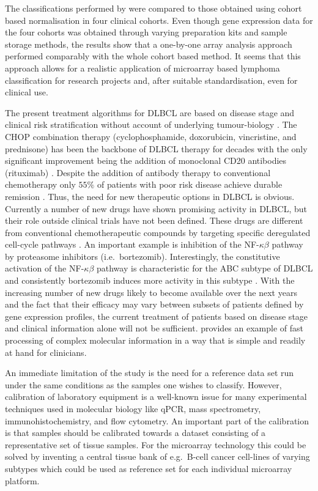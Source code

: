 \documentclass{article}
\begin{document}
The classifications performed by \hemaClass{} were compared to those obtained using cohort based normalisation in four clinical cohorts.
Even though gene expression data for the four cohorts was obtained through varying preparation kits and sample storage methods, the results show that a one-by-one array analysis approach performed comparably with the whole cohort based method.
It seems that this approach allows for a realistic application of microarray based lymphoma classification for research projects and, after suitable standardisation, even for clinical use.

The present treatment algorithms for DLBCL are based on disease stage and clinical risk stratification without account of underlying tumour-biology \citep{Schmoll2012}.
The CHOP combination therapy (cyclophosphamide, doxorubicin, vincristine, and prednisone) has been the backbone of DLBCL therapy for decades with the only significant improvement being the addition of monoclonal CD20 antibodies (rituximab) \citep{Coiffier2002a}.
Despite the addition of antibody therapy to conventional chemotherapy only $55\%$ of patients with poor risk disease achieve durable remission \citep{Ziepert2010}.
Thus, the need for new therapeutic options in DLBCL is obvious.
Currently a number of new drugs have shown promising activity in DLBCL, but their role outside clinical trials have not been defined.
These drugs are different from conventional chemotherapeutic compounds by targeting specific deregulated cell-cycle pathways \citep{Friedberg2011}.
An important example is inhibition of the NF-$\kappa\beta$ pathway by proteasome inhibitors (i.e.\ bortezomib).
Interestingly, the constitutive activation of the NF-$\kappa\beta$ pathway is characteristic for the ABC subtype of DLBCL and consistently bortezomib induces more activity in this subtype \citep{Nogai2013}.
With the increasing number of new drugs likely to become available over the next years and the fact that their efficacy may vary between subsets of patients defined by gene expression profiles, the current treatment of patients based on disease stage and clinical information alone will not be sufficient.
\hemaClass{} provides an example of fast processing of complex molecular information in a way that is simple and readily at hand for clinicians.

An immediate limitation of the study is the need for a reference data set run under the same conditions as the samples one wishes to classify.
However, calibration of laboratory equipment is a well-known issue for many experimental techniques used in molecular biology like qPCR, mass spectrometry, immunohistochemistry, and flow cytometry.
An important part of the calibration is that samples should be calibrated towards a dataset consisting of a representative set of tissue samples.
For the microarray technology this could be solved by inventing a central tissue bank of e.g.\ B-cell cancer cell-lines of varying subtypes which could be used as reference set for each individual microarray platform.
\end{document}
